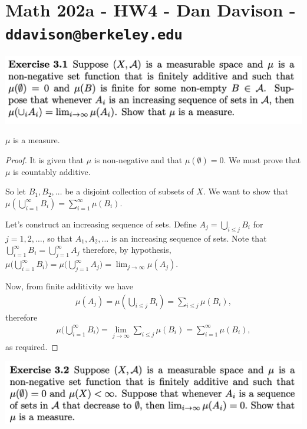 \section*{Math 202a - HW4 - Dan Davison - \texttt{ddavison@berkeley.edu}}
\begin{mdframed}
  \includegraphics[width=400pt]{img/analysis--berkeley-202a-hw04-f604.png}
\end{mdframed}
\begin{claim*}
  $\mu$ is a measure.
\end{claim*}
\begin{proof}
  It is given that $\mu$ is non-negative and that $\mu(\emptyset) = 0$. We must prove that $\mu$ is countably
  additive.

  So let $B_1, B_2, \dots$ be a disjoint collection of subsets of $X$. We want to show
  that $\mu(\bigcup_{i=1}^\infty B_i) = \sum_{i=1}^\infty \mu(B_i)$.

  Let's construct an increasing sequence of sets. Define $A_j = \bigcup_{i \leq j} B_i$ for $j=1, 2, \dots$, so
  that $A_1, A_2, \dots$ is an increasing sequence of sets. Note
  that $\bigcup_{i=1}^\infty B_i = \bigcup_{j=1}^\infty A_j$ therefore, by
  hypothesis,
  $\mu\big(\bigcup_{i=1}^\infty B_i\big) = \mu\big(\bigcup_{j=1}^\infty A_j\big) = \lim_{j\to\infty} \mu(A_j)$.

  Now, from finite additivity we have
  \begin{align*}
    \mu(A_j) = \mu(\bigcup_{i \leq j} B_i) = \sum_{i\leq j} \mu(B_i),
  \end{align*}
  therefore
  \begin{align*}
    \mu\big(\bigcup_{i=1}^\infty B_i\big) = \lim_{j\to\infty} \sum_{i\leq j} \mu(B_i) = \sum_{i=1}^\infty \mu(B_i),
  \end{align*}
  as required.
\end{proof}

\newpage
\begin{mdframed}
\includegraphics[width=400pt]{img/analysis--berkeley-202a-hw04-c187.png}
\end{mdframed}



